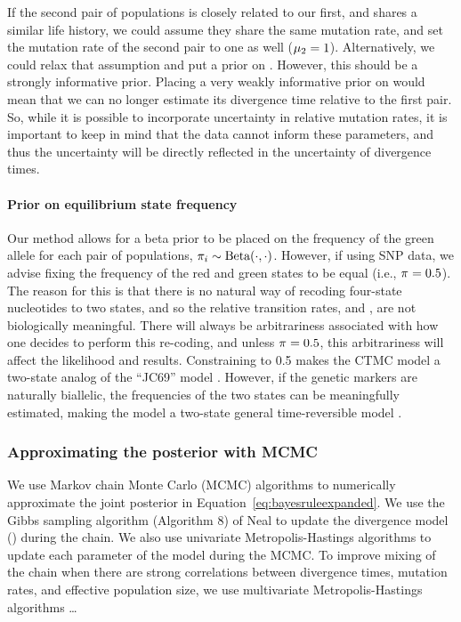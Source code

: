 If the second pair of populations is closely related to our first, and shares a
similar life history, we could assume they share the same mutation rate, and
set the mutation rate of the second pair to one as well ($\murate[2] = 1$).
Alternatively, we could relax that assumption and put a prior on \murate[2].
However, this should be a strongly informative prior.
Placing a very weakly informative prior on \murate[2] would mean that we can no
longer estimate its divergence time relative to the first pair.
So, while it is possible to incorporate uncertainty in relative mutation rates,
it is important to keep in mind that the data cannot inform these parameters,
and thus the uncertainty will be directly reflected in the uncertainty of
divergence times.

\paragraph{Prior on equilibrium state frequency}
Our method allows for a beta prior to be placed on the frequency of the green
allele for each pair of populations,
$\gfreq[i] \sim \textrm{Beta}(\cdot, \cdot)$.
However, if using SNP data, we advise fixing the frequency of the red and green
states to be equal (i.e., $\gfreq = 0.5$).
The reason for this is that there is no natural way of recoding four-state
nucleotides to two states, and so the relative transition rates, \rgmurate and
\grmurate, are not biologically meaningful.
There will always be arbitrariness associated with how one decides to perform
this re-coding, and unless $\gfreq = 0.5$, this arbitrariness will affect the
likelihood and results.
Constraining \gfreq to 0.5 makes the CTMC model a two-state analog of the
``JC69'' model \citep{JC1969}.
However, if the genetic markers are naturally biallelic, the frequencies of the
two states can be meaningfully estimated, making the model a two-state general
time-reversible model \citep{Tavare1986}.

\subsubsection{Approximating the posterior with MCMC}

We use Markov chain Monte Carlo (MCMC) algorithms to numerically approximate
the joint posterior in Equation~\ref{eq:bayesruleexpanded}.
We use the Gibbs sampling algorithm (Algorithm 8) of Neal \citeyear{Neal2000}
to update the divergence model (\divtimemodel) during the chain.
We also use univariate Metropolis-Hastings algorithms
\citep{Metropolis1953,Hastings1970} to update each parameter of the model
during the MCMC.
To improve mixing of the chain when there are strong correlations between
divergence times, mutation rates, and effective population size, we use
multivariate Metropolis-Hastings algorithms \ldots

